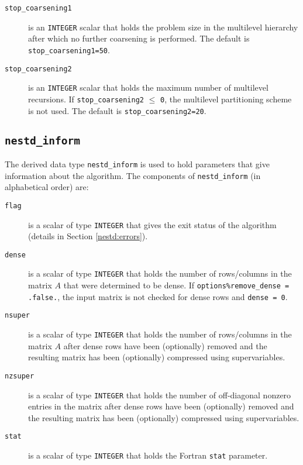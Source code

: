 \begin{description}
\item[\texttt{stop\_coarsening1}] is an {\tt INTEGER} scalar that holds the problem size in the multilevel hierarchy after which no further coarsening is performed.
The default is {\tt stop\_coarsening1=50}.

\item[\texttt{stop\_coarsening2}] is an {\tt INTEGER} scalar that holds the maximum number
of multilevel recursions.  If 
{\tt stop\_coarsening2} $\le$ {\tt 0}, the multilevel partitioning scheme is not used. 
The default is {\tt stop\_coarsening2=20}.

\end{description}




\subsection{\texttt{nestd\_inform}}
\label{nestd:type:inform}
The derived data type {\tt nestd\_inform}
is used to hold parameters that give information about the algorithm. The 
components of {\tt nestd\_inform}
(in alphabetical order) are:

\begin{description}

\item[\texttt{flag}] is a scalar of type  {\tt INTEGER}
that gives the exit status of the algorithm (details in Section \ref{nestd:errors}).

\item[\texttt{dense}] is a scalar of type {\tt INTEGER} that holds 
the number of rows/columns in the matrix $A$ that were determined to be dense. 
If {\tt options\%remove\_dense = .false.}, the input matrix is not checked for 
dense rows and {\tt dense = 0}.

\item[\texttt{nsuper}] is a scalar of type {\tt INTEGER} that holds the number of 
rows/columns in the matrix $A$ after dense rows have been (optionally) removed and 
the resulting matrix has been (optionally) compressed using supervariables. 

\item[\texttt{nzsuper}] is a scalar of type {\tt INTEGER} that holds the number of 
off-diagonal nonzero entries in the matrix after dense rows have been 
(optionally) removed and the resulting matrix has been (optionally) compressed 
using supervariables. 

\item[\texttt{stat}] is a scalar of type  {\tt INTEGER}
that holds the Fortran {\tt stat} parameter. 


\end{description}


